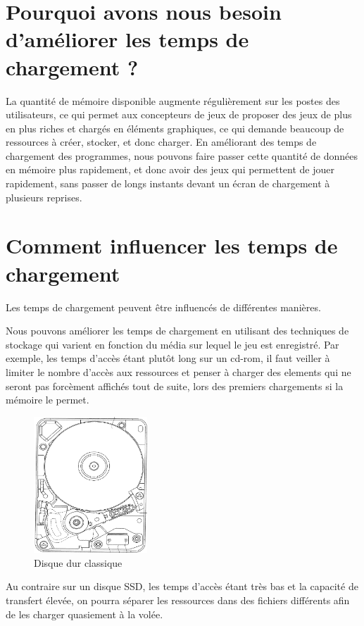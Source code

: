 \documentclass[a4paper, 11pt]{article} %
\begin{document}
\section*{Pourquoi avons nous besoin d'améliorer les temps de chargement ?}
La quantité de mémoire disponible augmente régulièrement sur les postes des utilisateurs, ce qui permet aux concepteurs de jeux de proposer des jeux de plus en plus riches et chargés en éléments graphiques, ce qui demande beaucoup de ressources à créer, stocker, et donc charger. En améliorant des temps de chargement des programmes, nous pouvons faire passer cette quantité de données en mémoire plus rapidement, et donc avoir des jeux qui permettent de jouer rapidement, sans passer de longs instants devant un écran de chargement à plusieurs reprises.

\section*{Comment influencer les temps de chargement}
Les temps de chargement peuvent être influencés de différentes manières.

Nous pouvons améliorer les temps de chargement en utilisant des techniques de stockage qui varient en fonction du média sur lequel le jeu est enregistré. Par exemple, les temps d'accès étant plutôt long sur un cd-rom, il faut veiller à limiter le nombre d'accès aux ressources et penser à charger des elements qui ne seront pas forcèment affichés tout de suite, lors des premiers chargements si la mémoire le permet.
\begin{figure}
\begin{center}
\includegraphics[width=0.38\textwidth]{images/hdd.png}
\end{center}
\caption{Disque dur classique}
\end{figure}
Au contraire sur un disque SSD, les temps d'accès étant très bas et la capacité de transfert élevée, on pourra séparer les ressources dans des fichiers différents afin de les charger quasiement à la volée.
\end{document}
